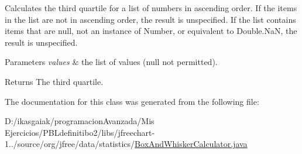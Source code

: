 Calculates the third quartile for a list of numbers in ascending order. If the items in the list are not in ascending order, the result is unspecified. If the list contains items that are {\ttfamily null}, not an instance of {\ttfamily Number}, or equivalent to {\ttfamily Double.\+NaN}, the result is unspecified.


\begin{DoxyParams}{Parameters}
{\em values} & the list of values ({\ttfamily null} not permitted).\\
\hline
\end{DoxyParams}
\begin{DoxyReturn}{Returns}
The third quartile. 
\end{DoxyReturn}


The documentation for this class was generated from the following file\+:\begin{DoxyCompactItemize}
\item 
D\+:/ikasgaiak/programacion\+Avanzada/\+Mis Ejercicios/\+P\+B\+Ldefinitibo2/libs/jfreechart-\/1../source/org/jfree/data/statistics/\mbox{\hyperlink{_box_and_whisker_calculator_8java}{Box\+And\+Whisker\+Calculator.\+java}}\end{DoxyCompactItemize}

